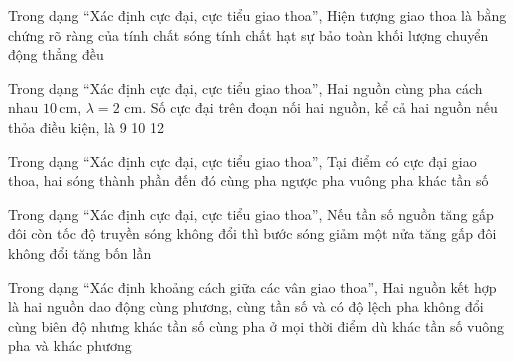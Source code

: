 \begin{ex}
Trong dạng “Xác định cực đại, cực tiểu giao thoa”, Hiện tượng giao thoa là bằng chứng rõ ràng của
\choice
{\True tính chất sóng}
{tính chất hạt}
{sự bảo toàn khối lượng}
{chuyển động thẳng đều}
\end{ex}

\begin{ex}
Trong dạng “Xác định cực đại, cực tiểu giao thoa”, Hai nguồn cùng pha cách nhau $10\,\text{cm}$, $\lambda=2$ cm. Số cực đại trên đoạn nối hai nguồn, kể cả hai nguồn nếu thỏa điều kiện, là
\choice
{9}
{10}
{}
{12}
\end{ex}

\begin{ex}
Trong dạng “Xác định cực đại, cực tiểu giao thoa”, Tại điểm có cực đại giao thoa, hai sóng thành phần đến đó
\choice
{\True cùng pha}
{ngược pha}
{vuông pha}
{khác tần số}
\end{ex}

\begin{ex}
Trong dạng “Xác định cực đại, cực tiểu giao thoa”, Nếu tần số nguồn tăng gấp đôi còn tốc độ truyền sóng không đổi thì bước sóng
\choice
{\True giảm một nửa}
{tăng gấp đôi}
{không đổi}
{tăng bốn lần}
\end{ex}

\begin{ex}
Trong dạng “Xác định khoảng cách giữa các vân giao thoa”, Hai nguồn kết hợp là hai nguồn dao động
\choice
{\True cùng phương, cùng tần số và có độ lệch pha không đổi}
{cùng biên độ nhưng khác tần số}
{cùng pha ở mọi thời điểm dù khác tần số}
{vuông pha và khác phương}
\end{ex}

